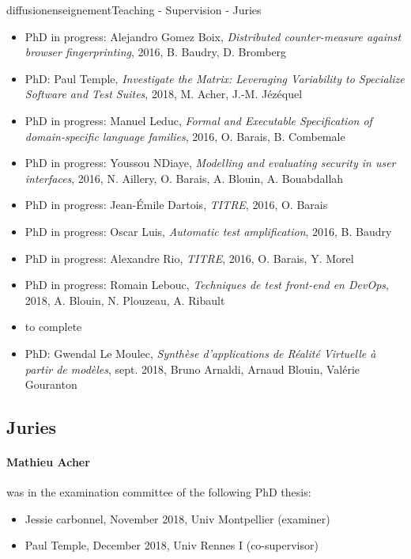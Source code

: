 \documentclass{ra2018}
\begin{document}
\begin{module}{diffusion}{enseignement}{Teaching - Supervision - Juries}
\begin{itemize}
\item PhD in progress: Alejandro Gomez Boix, \emph{Distributed counter-measure against browser fingerprinting}, 2016, B. Baudry, D. Bromberg
\item PhD: Paul Temple, \emph{Investigate the Matrix: Leveraging Variability to Specialize Software and Test Suites}, 2018, M. Acher, J.-M. Jézéquel
\item PhD in progress: Manuel Leduc, \emph{Formal and Executable Specification of domain-specific language families}, 2016, O. Barais, B. Combemale
\item PhD in progress: Youssou NDiaye, \emph{Modelling and evaluating security in user interfaces}, 2016, N. Aillery, O. Barais, A. Blouin, A. Bouabdallah
\item PhD in progress: Jean-Émile Dartois, \emph{TITRE}, 2016, O. Barais
\item PhD in progress: Oscar Luis, \emph{Automatic test amplification}, 2016, B. Baudry
\item PhD in progress: Alexandre Rio, \emph{TITRE}, 2016, O. Barais, Y. Morel
\item PhD in progress: Romain Lebouc, \emph{Techniques de test front-end en DevOps}, 2018, A. Blouin, N. Plouzeau, A. Ribault
\item to complete %

\item PhD: Gwendal Le Moulec, \emph{Synthèse d'applications de Réalité Virtuelle à partir de modèles}, sept. 2018, Bruno Arnaldi, Arnaud Blouin, Valérie Gouranton

\end{itemize} 


\subsection {Juries}

\paragraph*{Mathieu Acher} was in the examination committee of the following PhD thesis: 
\begin{itemize}
	\item Jessie carbonnel, November 2018, Univ Montpellier (examiner)
	\item Paul Temple, December 2018, Univ Rennes I (co-supervisor) 
\end{itemize}
\end{module}
\end{document}
